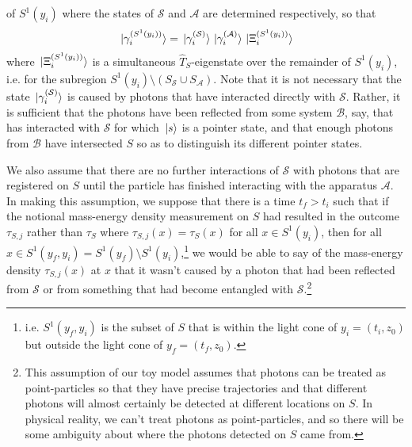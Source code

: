   of $S^1(y_i)$ where the states of $\mathcal{S}$ and $\mathcal{A}$ are determined respectively, so that 
\begin{equation}\label{gammadecomp}
\ket*{\gamma^{(S^1(y_i))}_i}=\ket*{\gamma^{(\mathcal{S})}_i}\ket*{\gamma^{(\mathcal{A})}_i}\ket*{\Xi^{(S^1(y_i))}_i}
\end{equation}
where $\ket*{\Xi^{(S^1(y_i))}_i}$ is a simultaneous $\hat{T}_S$-eigenstate over the remainder of $S^1(y_i)$, i.e. for the subregion $S^1(y_i)\setminus(S_{\mathcal{S}}\cup S_{\mathcal{A}})$.
%
%
 Note that it is not necessary that the state $\ket*{\gamma^{(\mathcal{S})}_i}$ is caused by photons that have interacted directly with $\mathcal{S}$. Rather, it is sufficient that the photons have been reflected from some system $\mathcal{B}$, say, that has interacted with $\mathcal{S}$ for which $\ket*{s}$ is a pointer state, and that enough photons from $\mathcal{B}$ have intersected $S$ so as to distinguish its different pointer states. 

We also assume that there are no further interactions of $\mathcal{S}$ with photons that are registered on $S$ until the particle has finished interacting with the apparatus $\mathcal{A}$.  In making this assumption, we suppose that there is a time $t_f>t_i$	%
 such that if the notional mass-energy density measurement on $S$ had resulted in the outcome $\tau_{S,j}$ rather than $\tau_S$ where $\tau_{S,j}(x)=\tau_S(x)$ for all $x\in S^1(y_i)$, then for all $x \in S^1(y_f,y_i)=S^1(y_f)\setminus S^1(y_i)$,\footnote{i.e. $S^1(y_f,y_i)$ is the subset of $S$ that is within the light cone of $y_i=(t_i, z_0)$ but outside the light cone of $y_f=(t_f, z_0)$.}  %
%
we would be able to say of the mass-energy density $\tau_{S,j}(x)$ at $x$ that it wasn't caused by a photon that had been reflected from $\mathcal{S}$ or from something that had become entangled with $\mathcal{S}$.\footnote{This assumption of our toy model assumes that photons can be treated as point-particles so that they have precise trajectories and that different photons will almost certainly be detected at different locations on $S$. In physical reality, we can't treat photons as point-particles, and so there will be some ambiguity about where the photons detected on $S$ came from.}

